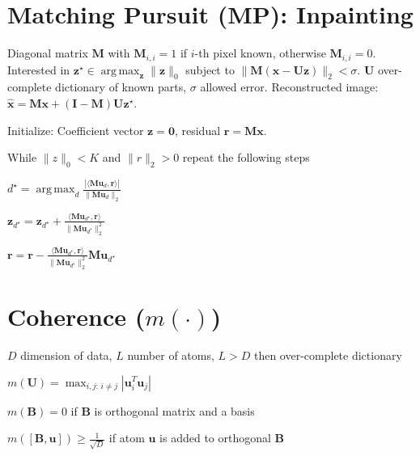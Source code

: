 \documentclass[a4paper, 11pt, landscape]{article}
\DeclareMathOperator*{\argmax}{arg\,max}
\begin{document}
\begin{multicols*}{3}
\section{Matching Pursuit (MP): Inpainting}
Diagonal matrix $\mathbf{M}$ with $\mathbf{M}_{i, i} = 1$ if $i$-th pixel known, otherwise $\mathbf{M}_{i,i} = 0$. Interested in $\mathbf{z}^\star \in \argmax_{\mathbf{z}} \|\mathbf{z}\|_0$ subject to $\|\mathbf{M}(\mathbf{x} - \mathbf{Uz})\|_2 < \sigma$. $\mathbf{U}$ over-complete dictionary of known parts, $\sigma$ allowed error. Reconstructed image: $\hat{\mathbf{x}} = \mathbf{Mx} + (\mathbf{I} - \mathbf{M})\mathbf{U} \mathbf{z}^\star$.
\begin{compactenum}
	\item Initialize: Coefficient vector $\mathbf{z} = \mathbf{0}$, residual $\mathbf{r} = \mathbf{M}\mathbf{x}$.
	\item While $\|z\|_0 < K$ and $\|r\|_2 > 0$ repeat the following steps
	\begin{listcols}[2][5pt]
		\item $d^\star = \argmax_d \frac{|\langle \mathbf{M}\mathbf{u}_d, \mathbf{r}\rangle|}{\|\mathbf{M}\mathbf{u}_d\|_2}$
		\item $\mathbf{z}_{d^\star} = \mathbf{z}_{d^\star} + \frac{\langle \mathbf{M}\mathbf{u}_{d^\star}, \mathbf{r} \rangle}{\|\mathbf{M}\mathbf{u}_{d^\star}\|_2^2}$
		\item $\mathbf{r} = \mathbf{r} - \frac{\langle \mathbf{M}\mathbf{u}_{d^\star}, \mathbf{r} \rangle}{\|\mathbf{M}\mathbf{u}_{d^\star}\|_2^2} \mathbf{M}\mathbf{u}_{d^\star}$
	\end{listcols}
\end{compactenum}


\section{Coherence ($m(\cdot)$)}
\begin{compactitem}
	\item $D$ dimension of data, $L$ number of atoms, $L > D$ then over-complete dictionary
	\item $m(\mathbf{U}) = \max_{i,j:\, i \neq j} | \mathbf{u}_i^T \mathbf{u}_j |$
	\item $m(\mathbf{B}) = 0$ if $\mathbf{B}$ is orthogonal matrix and a basis
	\item $m([\mathbf{B}, \mathbf{u}]) \geq \frac{1}{\sqrt{D}}$ if atom $\mathbf{u}$ is added to orthogonal $\mathbf{B}$
\end{compactitem}


\end{multicols*}
\end{document}

